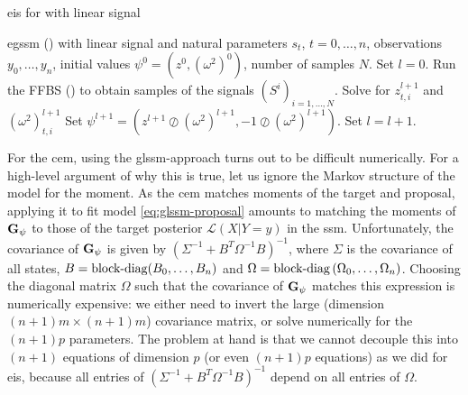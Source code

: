 \begin{algorithm}
    \caption{\gls{eis} for  with linear signal}
    \label{alg:eis}
    \begin{algorithmic}[1]
        \Require \acrshort{egssm} () with linear signal and natural parameters $s_{t}$, $t = 0, \dots, n$, observations $y_{0}, \dots, y_{n}$, initial values $\psi^{0} = \left( z^{0}, (\omega^{2})^{0} \right)$, number of samples $N$.
        \State Set $l = 0$.
        \Repeat
            \State Run the FFBS () to obtain samples of the signals $(S^{i})_{i = 1, \dots, N}$. 
                    \State Solve  for $z^{l + 1}_{t,i}$ and $(\omega^{2})^{l + 1}_{t,i}$ 
                \EndFor
            \EndFor
            \State Set $\psi^{l + 1} = \left( z^{l + 1} \oslash (\omega^{2})^{l + 1}, -1 \oslash (\omega^{2})^{l + 1}\right)$.
            \State Set $l = l +1$.
        
    \end{algorithmic}
\end{algorithm}

For the \gls{cem}, using the \gls{glssm}-approach turns out to be difficult numerically. For a high-level argument of why this is true, let us ignore the Markov structure of the model for the moment. As the \gls{cem} matches moments of the target and proposal, applying it to fit model \eqref{eq:glssm-proposal} amounts to matching the moments of $\mathbf G_{\psi}$ to those of the target posterior $\mathcal L (X | Y = y)$ in the \gls{ssm}. Unfortunately, the covariance of $\mathbf G_{\psi}$ is given by $ \left( \Sigma^{-1} + B^{T}\Omega^{-1} B \right)^{-1}$, where $\Sigma$ is the covariance of all states, $B = \operatorname{block-diag} (B_{0}, \dots, B_{n})$ and $\Omega = \operatorname{block-diag} \left( \Omega_{0}, \dots, \Omega_{n} \right)$. Choosing the diagonal matrix $\Omega$ such that the covariance of $\mathbf G_{\psi}$ matches this expression is numerically expensive: we either need to invert the large (dimension $(n + 1)m \times (n + 1)m$) covariance matrix, or solve numerically for the $(n + 1)p$ parameters. The problem at hand is that we cannot decouple this into $(n + 1)$ equations of dimension $p$ (or even $(n+1)p$ equations) as we did for \gls{eis}, because all entries of $(\Sigma^{-1} + B^{T}\Omega^{-1} B)^{-1}$ depend on all entries of $\Omega$. 

